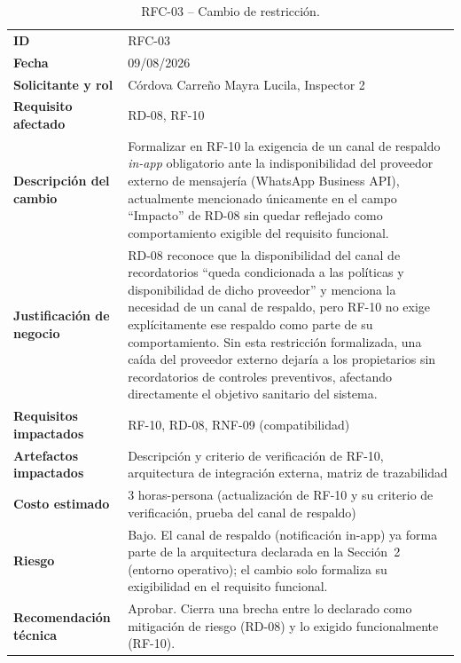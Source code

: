 \documentclass[journal,onecolumn]{IEEEtran}
\begin{document}
\begin{table}[H]
	\centering
	\small
	\begin{tabularx}{\textwidth}{@{}l X@{}}
		\toprule
		\textbf{ID} & RFC-03 \\
		\textbf{Fecha} & 09/08/2026 \\
		\textbf{Solicitante y rol} & Córdova Carreño Mayra Lucila, Inspector 2 \\
		\textbf{Requisito afectado} & RD-08, RF-10 \\
		\midrule
		\textbf{Descripción del cambio} & Formalizar en RF-10 la exigencia de un canal de respaldo \textit{in-app} obligatorio ante la indisponibilidad del proveedor externo de mensajería (WhatsApp Business API), actualmente mencionado únicamente en el campo ``Impacto'' de RD-08 sin quedar reflejado como comportamiento exigible del requisito funcional. \\
		\textbf{Justificación de negocio} & RD-08 reconoce que la disponibilidad del canal de recordatorios ``queda condicionada a las políticas y disponibilidad de dicho proveedor'' y menciona la necesidad de un canal de respaldo, pero RF-10 no exige explícitamente ese respaldo como parte de su comportamiento. Sin esta restricción formalizada, una caída del proveedor externo dejaría a los propietarios sin recordatorios de controles preventivos, afectando directamente el objetivo sanitario del sistema. \\
		\textbf{Requisitos impactados} & RF-10, RD-08, RNF-09 (compatibilidad) \\
		\textbf{Artefactos impactados} & Descripción y criterio de verificación de RF-10, arquitectura de integración externa, matriz de trazabilidad \\
		\textbf{Costo estimado} & 3 horas-persona (actualización de RF-10 y su criterio de verificación, prueba del canal de respaldo) \\
		\textbf{Riesgo} & Bajo. El canal de respaldo (notificación in-app) ya forma parte de la arquitectura declarada en la Sección~2 (entorno operativo); el cambio solo formaliza su exigibilidad en el requisito funcional. \\
		\textbf{Recomendación técnica} & Aprobar. Cierra una brecha entre lo declarado como mitigación de riesgo (RD-08) y lo exigido funcionalmente (RF-10). \\
		\bottomrule
	\end{tabularx}
	\caption{RFC-03 -- Cambio de restricción.}
	\label{tab:rfc-03}
\end{table}
\end{document}
